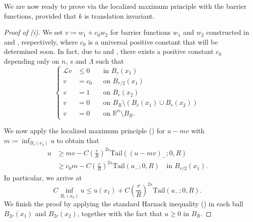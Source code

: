 \documentclass[11pt]{amsart}
\theoremstyle{plain}
\theoremstyle{definition}
\numberwithin{equation}{section}
\begin{document}
We are now ready to prove  via the localized maximum principle with the barrier functions, provided that $k$ is translation invariant.

\begin{proof}[Proof of  (i)]
    We set $v \coloneqq w_1+c_0w_2$ for barrier functions $w_1$ and $w_2$ constructed in  and , respectively, where $c_0$ is a universal positive constant that will be determined soon. In fact, due to  and , there exists a positive constant $c_0$ depending only on $n$, $s$ and $\Lambda$ such that
    \begin{equation*}
        \left\{ \begin{aligned}
        \mathcal{L}v &\leq 0 && \text{in $B_r(x_1)$} \\
        v&= c_0 && \text{on $B_{r/2}(x_1)$}\\
        v&= 1 && \text{on $B_{r}(x_2)$}\\
        v&=0 && \text{on $B_R \setminus (B_{r}(x_1)\cup B_r(x_2))$}\\
        v&=0 && \text{on $\mathbb{R}^n \setminus B_R$}.
        \end{aligned} \right.
    \end{equation*}

    We now apply the localized maximum principle () for $u-mv$ with $m \coloneqq  \inf_{B_r(x_2)}u$ to obtain that
    \begin{equation*}
        \begin{aligned}
            u &\geq mv -C\left(\frac{r}{R}\right)^{2s}\mathrm{Tail}((u-mv)_-; 0, R)\\
                &\geq c_0m -C\left(\frac{r}{R}\right)^{2s}\mathrm{Tail}(u_-; 0, R) \quad \text{in $B_{r/2}(x_1)$}.
        \end{aligned}
    \end{equation*}
    In particular, we arrive at
    \begin{equation*}
        C \inf_{B_r(x_2)}u \leq u(x_1)+C\left(\frac{r}{R}\right)^{2s}\mathrm{Tail}(u_-; 0, R).
    \end{equation*}
    We finish the proof by applying the standard Harnack inequality () in each ball $B_{2r}(x_1)$ and $B_{2r}(x_2)$, together with the fact that $u \geq 0$ in $B_R$.
\end{proof}
\end{document}
